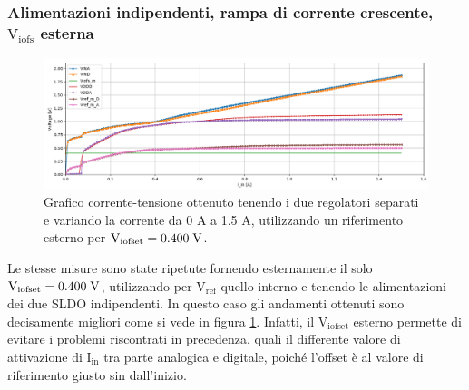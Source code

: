 \subsubsection{Alimentazioni indipendenti, rampa di corrente crescente, $\mathrm{V_{iofs}}$ esterna} 

\begin{figure}
\centering
\includegraphics[width=\textwidth]{Immagini/IUEViofs2}
\caption{Grafico corrente-tensione ottenuto tenendo i due regolatori separati e variando la corrente da 0 A a 1.5 A, utilizzando un riferimento esterno per $\mathrm{V_{iofset}}=0.400 \rm \; V$.}
\label{IUEViofs}
\end{figure}
Le stesse misure sono state ripetute fornendo esternamente il solo $\mathrm{V_{iofset}}=0.400 \rm \; V$, utilizzando per $\mathrm{V_{ref}}$ quello interno e tenendo le alimentazioni dei due SLDO indipendenti. 
In questo caso gli andamenti ottenuti sono decisamente migliori come si vede in figura \ref{IUEViofs}. 
Infatti, il $\mathrm{V_{iofset}}$ esterno permette di evitare i problemi riscontrati in precedenza, quali il differente valore di attivazione di $\mathrm{I_{in}}$ tra parte analogica e digitale, poiché l'offset è al valore di riferimento giusto sin dall'inizio.
% 
%
%


